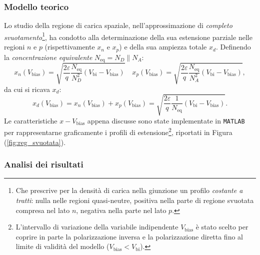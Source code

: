 \documentclass[a4paper,11pt]{report}
\begin{document}
\subsubsection{Modello teorico}
Lo studio della regione di carica spaziale, nell'approssimazione di \textit{completo svuotamento}\footnote{Che prescrive per la densità di carica nella giunzione un profilo \textit{costante a tratti}: nulla nelle regioni quasi-neutre, positiva nella parte di regione svuotata compresa nel lato $n$, negativa nella parte nel lato $p$.}, ha condotto alla determinazione della sua estensione parziale nelle regioni $n$ e $p$ (rispettivamente $x_n$ e $x_p$) e della sua ampiezza totale $x_d$. Definendo la \textit{concentrazione equivalente} $N_{\text{eq}} = N_D \parallel N_A$: 
\begin{equation}
x_n(V_{\text{bias}}) = \sqrt{\frac{2\varepsilon}{q}\frac{N_{\text{eq}}}{N_D^2}(V_{\text{bi}} - V_{\text{bias}})} \quad x_p(V_{\text{bias}}) = \sqrt{\frac{2\varepsilon}{q}\frac{N_{\text{eq}}}{N_A^2}(V_{\text{bi}} - V_{\text{bias}})}
\label{eq:x_n_x_p},
\end{equation}
da cui si ricava $x_d$:
\begin{equation}
x_d(V_{\text{bias}}) = x_n(V_{\text{bias}}) + x_p(V_{\text{bias}}) = \sqrt{\frac{2\varepsilon}{q}\frac{1}{N_{\text{eq}}}(V_{\text{bi}} - V_{\text{bias}})}.
\label{eq:x_d}
\end{equation}
Le caratteristiche $x-V_{\text{bias}}$ appena discusse sono state implementate in \texttt{MATLAB} per rappresentarne graficamente i profili di estensione\footnote{L'intervallo di variazione della variabile indipendente $V_{\text{bias}}$ è stato scelto per coprire in parte la polarizzazione inversa e la polarizzazione diretta fino al limite di validità del modello ($V_{\text{bias}} < V_{\text{bi}}$).}, riportati in Figura (\ref{fig:reg_svuotata}). 

\subsubsection{Analisi dei risultati}
\end{document}
